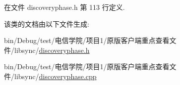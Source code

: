 在文件 discoveryphase.\+h 第 113 行定义.



该类的文档由以下文件生成\+:\begin{DoxyCompactItemize}
\item 
bin/\+Debug/test/电信学院/项目1/原版客户端重点查看文件/libsync/\hyperlink{discoveryphase_8h}{discoveryphase.\+h}\item 
bin/\+Debug/test/电信学院/项目1/原版客户端重点查看文件/libsync/\hyperlink{discoveryphase_8cpp}{discoveryphase.\+cpp}\end{DoxyCompactItemize}
